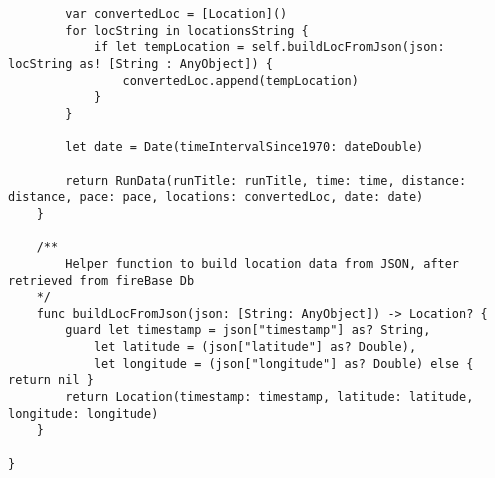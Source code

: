 \begin{verbatim}
        var convertedLoc = [Location]()
        for locString in locationsString {
            if let tempLocation = self.buildLocFromJson(json: locString as! [String : AnyObject]) {
                convertedLoc.append(tempLocation)
            }
        }

        let date = Date(timeIntervalSince1970: dateDouble)

        return RunData(runTitle: runTitle, time: time, distance: distance, pace: pace, locations: convertedLoc, date: date)
    }

    /**
        Helper function to build location data from JSON, after retrieved from fireBase Db
    */
    func buildLocFromJson(json: [String: AnyObject]) -> Location? {
        guard let timestamp = json["timestamp"] as? String,
            let latitude = (json["latitude"] as? Double),
            let longitude = (json["longitude"] as? Double) else { return nil }
        return Location(timestamp: timestamp, latitude: latitude, longitude: longitude)
    }

}
\end{verbatim}
